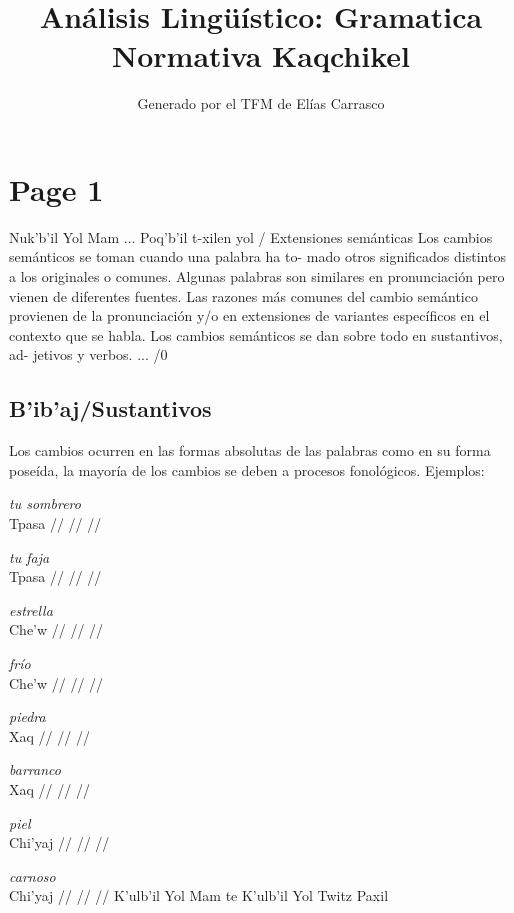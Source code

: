 \documentclass{article}%
\title{Análisis Lingüístico: Gramatica Normativa Kaqchikel}%
\author{Generado por el TFM de Elías Carrasco}%
\begin{document}
%
\normalsize%
\maketitle%
\section{Page 1}%
\label{sec:Page1}%
Nuk'b'il Yol Mam %
... Poq'b'il t{-}xilen yol / Extensiones semánticas %
Los cambios semánticos se toman cuando una palabra ha to{-} %
mado otros significados distintos a los originales o comunes. %
Algunas palabras son similares en pronunciación pero vienen %
de diferentes fuentes. %
Las razones más comunes del cambio semántico provienen de %
la pronunciación y/o en extensiones de variantes específicos %
en el contexto que se habla. %
Los cambios semánticos se dan sobre todo en sustantivos, ad{-} %
jetivos y verbos. %
... /0 %
\subsection{B'ib'aj/Sustantivos}%
\label{subsec:Bibaj/Sustantivos}%

%
Los cambios ocurren en las formas absolutas de las palabras %
como en su forma poseída, la mayoría de los cambios se deben %
a procesos fonológicos. %
Ejemplos: %
\par\medskip%
\ex
\textit{tu sombrero} \\
\begingl
\gla Tpasa //
\glb  //
\glc  //
\endgl
\xe
%
\medskip%
\par\medskip%
\ex
\textit{tu faja} \\
\begingl
\gla Tpasa //
\glb  //
\glc  //
\endgl
\xe
%
\medskip%
\par\medskip%
\ex
\textit{estrella} \\
\begingl
\gla Che'w //
\glb  //
\glc  //
\endgl
\xe
%
\medskip%
\par\medskip%
\ex
\textit{frío} \\
\begingl
\gla Che'w //
\glb  //
\glc  //
\endgl
\xe
%
\medskip%
\par\medskip%
\ex
\textit{piedra} \\
\begingl
\gla Xaq //
\glb  //
\glc  //
\endgl
\xe
%
\medskip%
\par\medskip%
\ex
\textit{barranco} \\
\begingl
\gla Xaq //
\glb  //
\glc  //
\endgl
\xe
%
\medskip%
\par\medskip%
\ex
\textit{piel} \\
\begingl
\gla Chi'yaj //
\glb  //
\glc  //
\endgl
\xe
%
\medskip%
\par\medskip%
\ex
\textit{carnoso} \\
\begingl
\gla Chi'yaj //
\glb  //
\glc  //
\endgl
\xe
%
K'ulb'il Yol Mam te K'ulb'il Yol Twitz Paxil 

%
\end{document}

